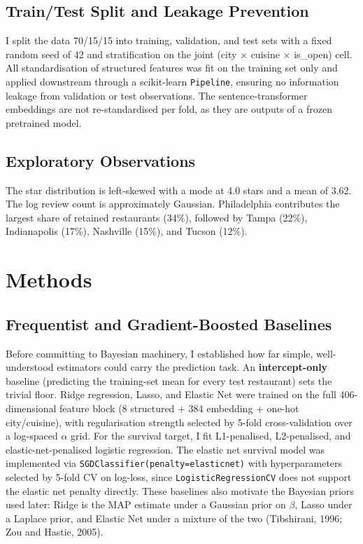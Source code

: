 \documentclass[10pt, letterpaper]{article}
\begin{document}
\subsection{Train/Test Split and Leakage Prevention}

I split the data 70/15/15 into training, validation, and test sets with a fixed random seed of 42 and stratification on the joint (city $\times$ cuisine $\times$ is\_open) cell. All standardisation of structured features was fit on the training set only and applied downstream through a scikit-learn \texttt{Pipeline}, ensuring no information leakage from validation or test observations. The sentence-transformer embeddings are not re-standardised per fold, as they are outputs of a frozen pretrained model.

\subsection{Exploratory Observations}

The star distribution is left-skewed with a mode at 4.0 stars and a mean of 3.62. The log review count is approximately Gaussian. Philadelphia contributes the largest share of retained restaurants (34\%), followed by Tampa (22\%), Indianapolis (17\%), Nashville (15\%), and Tucson (12\%).


\section{Methods}

\subsection{Frequentist and Gradient-Boosted Baselines}

Before committing to Bayesian machinery, I established how far simple, well-understood estimators could carry the prediction task. An \textbf{intercept-only} baseline (predicting the training-set mean for every test restaurant) sets the trivial floor. Ridge regression, Lasso, and Elastic Net were trained on the full 406-dimensional feature block (8 structured + 384 embedding + one-hot city/cuisine), with regularisation strength selected by 5-fold cross-validation over a log-spaced $\alpha$ grid. For the survival target, I fit L1-penalised, L2-penalised, and elastic-net-penalised logistic regression. The elastic net survival model was implemented via \texttt{SGDClassifier(penalty=\textquotesingle elasticnet\textquotesingle)} with hyperparameters selected by 5-fold CV on log-loss, since \texttt{LogisticRegressionCV} does not support the elastic net penalty directly. These baselines also motivate the Bayesian priors used later: Ridge is the MAP estimate under a Gaussian prior on $\beta$, Lasso under a Laplace prior, and Elastic Net under a mixture of the two (Tibshirani, 1996; Zou and Hastie, 2005).
\end{document}
